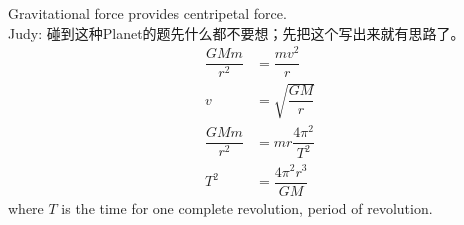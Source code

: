 \documentclass[a4paper,12pt]{article}
\begin{document}
\begin{center}
\end{center}
Gravitational force provides centripetal force. \\Judy: 碰到这种Planet的题先什么都不要想；先把这个写出来就有思路了。
\[\begin{aligned}
\dfrac{GMm}{r^2}&=\dfrac{mv^2}{r}\\
v&=\sqrt{\dfrac{GM}{r}}
\end{aligned}\] \[\begin{aligned}
\dfrac{GMm}{r^2}&=mr\dfrac{4\pi^2}{T^2}\\
T^2&=\dfrac{4\pi^2 r^3}{GM}
\end{aligned}\]
where $T$ is the time for one complete revolution, period of revolution.
\end{document}

